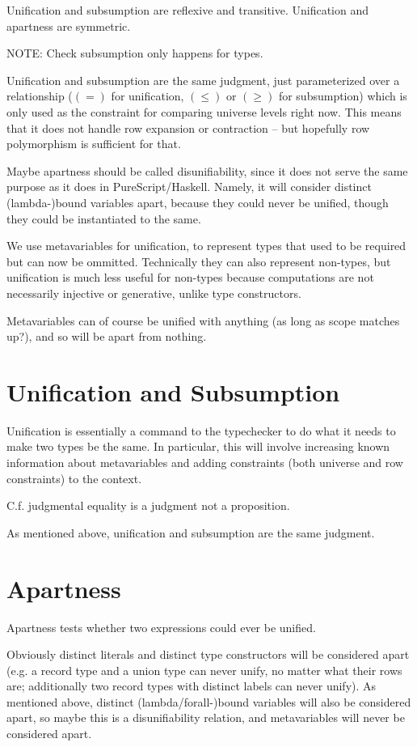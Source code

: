 \documentclass[11pt, twoside, reqno]{book}
\begin{document}
Unification and subsumption are reflexive and transitive.
Unification and apartness are symmetric.

NOTE: Check subsumption only happens for types.

Unification and subsumption are the same judgment, just parameterized over a relationship ($(=)$ for unification, $(\le)$ or $(\ge)$ for subsumption) which is only used as the constraint for comparing universe levels right now.
This means that it does not handle row expansion or contraction -- but hopefully row polymorphism is sufficient for that.

Maybe apartness should be called disunifiability, since it does not serve the same purpose as it does in PureScript/Haskell.
Namely, it will consider distinct (lambda-)bound variables apart, because they could never be unified, though they could be instantiated to the same.

We use metavariables for unification, to represent types that used to be required but can now be ommitted.
Technically they can also represent non-types, but unification is much less useful for non-types because computations are not necessarily injective or generative, unlike type constructors.

Metavariables can of course be unified with anything (as long as scope matches up?), and so will be apart from nothing.

\section{Unification and Subsumption}
Unification is essentially a command to the typechecker to do what it needs to make two types be the same.
In particular, this will involve increasing known information about metavariables and adding constraints (both universe and row constraints) to the context.

C.f. judgmental equality is a judgment not a proposition.

As mentioned above, unification and subsumption are the same judgment.



\section{Apartness}
Apartness tests whether two expressions could ever be unified.

Obviously distinct literals and distinct type constructors will be considered apart (e.g. a record type and a union type can never unify, no matter what their rows are; additionally two record types with distinct labels can never unify).
As mentioned above, distinct (lambda/forall-)bound variables will also be considered apart, so maybe this is a disunifiability relation, and metavariables will never be considered apart.
\end{document}
